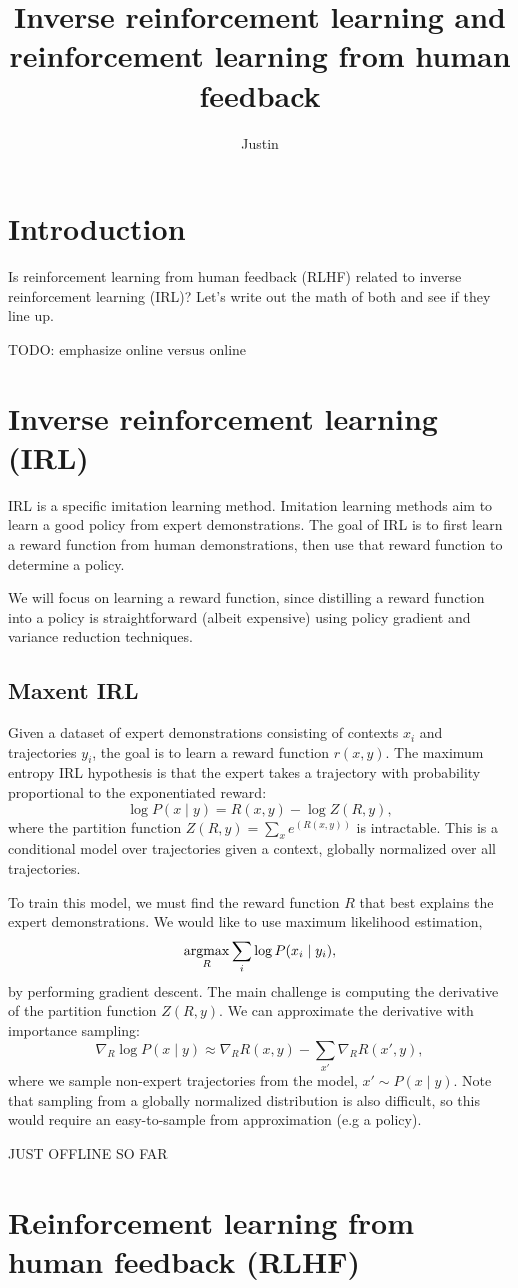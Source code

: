 \documentclass{article}
\begin{document}
\title{Inverse reinforcement learning and reinforcement learning from human feedback}
\author{Justin}
\maketitle

\section{Introduction}
Is reinforcement learning from human feedback (RLHF)
related to inverse reinforcement learning (IRL)?
Let's write out the math of both and see if they line up.

TODO: emphasize online versus online


\section{Inverse reinforcement learning (IRL)}
IRL is a specific imitation learning method.
Imitation learning methods aim to learn a good policy from expert demonstrations.
The goal of IRL is to first learn a reward function from human demonstrations,
then use that reward function to determine a policy.

We will focus on learning a reward function, since distilling a reward function into a policy
is straightforward (albeit expensive) using policy gradient and variance reduction techniques.

\subsection{Maxent IRL}
Given a dataset of expert demonstrations consisting of contexts
$x_i$ and trajectories $y_i$,
the goal is to learn a reward function $r(x, y)$.
The maximum entropy IRL hypothesis is that the expert takes a trajectory
with probability proportional to the exponentiated reward:
\begin{equation}
\log P(x \mid y) = R(x, y) - \log Z(R,y),
\end{equation}
where the partition function $Z(R,y) = \sum_x e^{(R(x,y))}$ is intractable.
This is a conditional model over trajectories given a context,
globally normalized over all trajectories.

To train this model, we must find the reward function $R$ that best explains the
expert demonstrations.
We would like to use maximum likelihood estimation,
$$\operatorname*{argmax}_R \sum_i \log P(x_i \mid y_i),$$
by performing gradient descent.
The main challenge is computing the derivative of the partition function $Z(R,y)$.
We can approximate the derivative with importance sampling:
$$\nabla_R \log P(x \mid y) \approx \nabla_R R(x,y) - \sum_{x'}\nabla_R R(x',y),$$
where we sample non-expert trajectories from the model, $x'\sim P(x \mid y)$.
Note that sampling from a globally normalized distribution is also difficult,
so this would require an easy-to-sample from approximation (e.g a policy).

JUST OFFLINE SO FAR

\section{Reinforcement learning from human feedback (RLHF)}
\end{document}
